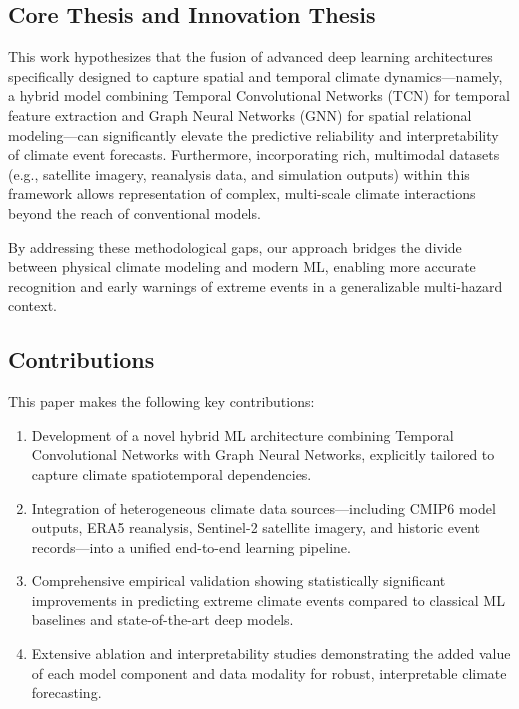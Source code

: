 \subsection{Core Thesis and Innovation Thesis}

This work hypothesizes that the fusion of advanced deep learning architectures specifically designed to capture spatial and temporal climate dynamics—namely, a hybrid model combining Temporal Convolutional Networks (TCN) for temporal feature extraction and Graph Neural Networks (GNN) for spatial relational modeling—can significantly elevate the predictive reliability and interpretability of climate event forecasts. Furthermore, incorporating rich, multimodal datasets (e.g., satellite imagery, reanalysis data, and simulation outputs) within this framework allows representation of complex, multi-scale climate interactions beyond the reach of conventional models.

By addressing these methodological gaps, our approach bridges the divide between physical climate modeling and modern ML, enabling more accurate recognition and early warnings of extreme events in a generalizable multi-hazard context.

\subsection{Contributions}

This paper makes the following key contributions:

\begin{enumerate}
    \item Development of a novel hybrid ML architecture combining Temporal Convolutional Networks with Graph Neural Networks, explicitly tailored to capture climate spatiotemporal dependencies.
    \item Integration of heterogeneous climate data sources—including CMIP6 model outputs, ERA5 reanalysis, Sentinel-2 satellite imagery, and historic event records—into a unified end-to-end learning pipeline.
    \item Comprehensive empirical validation showing statistically significant improvements in predicting extreme climate events compared to classical ML baselines and state-of-the-art deep models.
    \item Extensive ablation and interpretability studies demonstrating the added value of each model component and data modality for robust, interpretable climate forecasting.
\end{enumerate}

